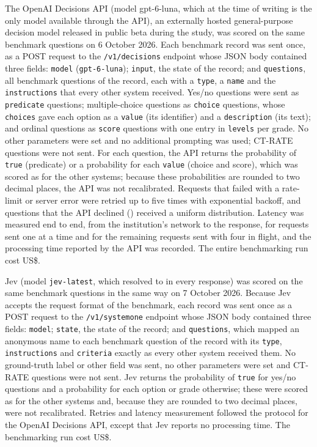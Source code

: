 \documentclass[11pt]{article}
\begin{document}
The OpenAI Decisions API \citep{openai2026decisions} (model gpt-6-luna, which at the time of writing is the only model available through the API), an externally hosted general-purpose decision model released in public beta during the study, was scored on the same benchmark questions on 6 October 2026. Each benchmark record was sent once, as a POST request to the \texttt{/v1/decisions} endpoint whose JSON body contained three fields: \texttt{model} (\texttt{gpt-6-luna}); \texttt{input}, the state of the record; and \texttt{questions}, all benchmark questions of the record, each with a \texttt{type}, a \texttt{name} and the \texttt{instructions} that every other system received. Yes/no questions were sent as \texttt{predicate} questions; multiple-choice questions as \texttt{choice} questions, whose \texttt{choices} gave each option as a \texttt{value} (its identifier) and a \texttt{description} (its text); and ordinal questions as \texttt{score} questions with one entry in \texttt{levels} per grade. No other parameters were set and no additional prompting was used; CT-RATE questions were not sent. For each question, the API returns the probability of \texttt{true} (predicate) or a probability for each \texttt{value} (choice and score), which was scored as for the other systems; because these probabilities are rounded to two decimal places, the API was not recalibrated. Requests that failed with a rate-limit or server error were retried up to five times with exponential backoff, and questions that the API declined () received a uniform distribution. Latency was measured end to end, from the institution's network to the response, for  requests sent one at a time and for the remaining  requests sent with four in flight, and the processing time reported by the API was recorded. The entire benchmarking run cost US\$.

Jev \citep{typesafe2026api} (model \texttt{jev-latest}, which resolved to \texttt{} in every response) was scored on the same benchmark questions in the same way on 7 October 2026. Because Jev accepts the request format of the benchmark, each record was sent once as a POST request to the \texttt{/v1/systemone} endpoint whose JSON body contained three fields: \texttt{model}; \texttt{state}, the state of the record; and \texttt{questions}, which mapped an anonymous name to each benchmark question of the record with its \texttt{type}, \texttt{instructions} and \texttt{criteria} exactly as every other system received them. No ground-truth label or other field was sent, no other parameters were set and CT-RATE questions were not sent. Jev returns the probability of \texttt{true} for yes/no questions and a probability for each option or grade otherwise; these were scored as for the other systems and, because they are rounded to two decimal places, were not recalibrated. Retries and latency measurement followed the protocol for the OpenAI Decisions API, except that Jev reports no processing time. The benchmarking run cost US\$.
\end{document}

